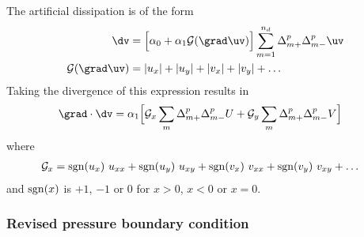 The artificial dissipation is of the form 
\begin{align*}
 \dv &=  \Big[ \alpha_0 + \alpha_1 {\cal G}(\grad\uv) \Big] \sum_{m=1}^{n_d} \Delta_{m+}^p\Delta_{m-}^p \uv \\
   {\cal G}(\grad\uv) &= |u_x| + |u_y| + |v_x| + |v_y| + \ldots
\end{align*}
Taking the divergence of this expression results in
\begin{align*}
\grad\cdot\dv &=  \alpha_1\Big[ {\cal G}_x \sum_{m}\Delta_{m+}^p\Delta_{m-}^p U 
                              + {\cal G}_y \sum_{m}\Delta_{m+}^p\Delta_{m-}^p V \Big]
\end{align*}
where
\begin{align*}
  {\cal G}_x &= {\rm sgn}(u_x)~u_{xx} + {\rm sgn}(u_y)~u_{xy}+ {\rm sgn}(v_x)~v_{xx}+ {\rm sgn}(v_y)~v_{xy}+\ldots
\end{align*}
and ${\rm sgn}(x)$ is $+1$, $-1$ or $0$ for $x>0$, $x<0$ or $x=0$.


\subsubsection{Revised pressure boundary condition}

